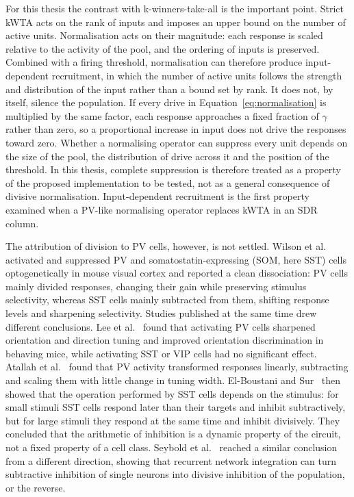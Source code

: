 For this thesis the contrast with k-winners-take-all is the important point.
Strict kWTA acts on the rank of inputs and imposes an upper bound on the
number of active units. Normalisation acts on their magnitude: each response
is scaled relative to the activity of the pool, and the ordering of inputs is
preserved. Combined with a firing threshold, normalisation can therefore
produce input-dependent recruitment, in which the number of active units
follows the strength and distribution of the input rather than a bound set by
rank. It does not, by itself, silence the population. If every drive in Equation~\ref{eq:normalisation} is multiplied by the same factor, each response approaches a
fixed fraction of $\gamma$ rather than zero, so a proportional increase in input does
not drive the responses toward zero. Whether a normalising operator can
suppress every unit depends on the size of the pool, the distribution of drive
across it and the position of the threshold. In this thesis, complete
suppression is therefore treated as a property of the proposed implementation
to be tested, not as a general consequence of divisive normalisation.
Input-dependent recruitment is the first property examined when a PV-like
normalising operator replaces kWTA in an SDR column.

The attribution of division to PV cells, however, is not settled.
Wilson et al.~\cite{wilson2012division} activated and suppressed PV and
somatostatin-expressing (SOM, here SST) cells optogenetically in mouse visual
cortex and reported a clean dissociation: PV cells mainly divided responses,
changing their gain while preserving stimulus selectivity, whereas SST cells
mainly subtracted from them, shifting response levels and sharpening
selectivity. Studies published at the same time drew different conclusions.
Lee et al.~\cite{lee2012activation} found that activating PV cells sharpened
orientation and direction tuning and improved orientation discrimination in
behaving mice, while activating SST or VIP cells had no significant effect.
Atallah et al.~\cite{atallah2012parvalbumin} found that PV activity transformed
responses linearly, subtracting and scaling them with little change in tuning
width. El-Boustani and Sur~\cite{elboustani2014response} then showed that the
operation performed by SST cells depends on the stimulus: for small stimuli SST
cells respond later than their targets and inhibit subtractively, but for large
stimuli they respond at the same time and inhibit divisively. They concluded
that the arithmetic of inhibition is a dynamic property of the circuit, not a
fixed property of a cell class. Seybold et al.~\cite{seybold2015} reached a
similar conclusion from a different direction, showing that recurrent network
integration can turn subtractive inhibition of single neurons into divisive
inhibition of the population, or the reverse.


